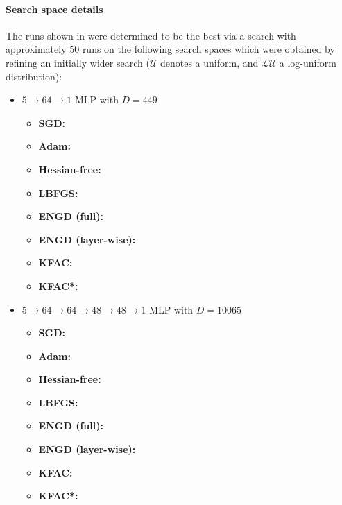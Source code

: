 \paragraph{Search space details} The runs shown in  were determined to be the best via a search with approximately 50 runs on the following search spaces which were obtained by refining an initially wider search ($\mathcal{U}$ denotes a uniform, and $\mathcal{LU}$ a log-uniform distribution):
\begin{itemize}
\item $5\to 64\to 1$ MLP with $D=449$
  \begin{itemize}
    \def\pathToRuns{kfac_pinns_exp/exp27_heat4d_small/tex}
  \item \textbf{SGD:} 
  \item \textbf{Adam:} 
  \item \textbf{Hessian-free:} 
  \item \textbf{LBFGS:} 
  \item \textbf{ENGD (full):} 
  \item \textbf{ENGD (layer-wise):} 
  \item \textbf{KFAC:} 
  \item \textbf{KFAC*:} 
  \end{itemize}

\item $5 \to 64 \to 64 \to 48 \to 48 \to 1$ MLP with $D=\num{10065}$
  \begin{itemize}
    \def\pathToRuns{kfac_pinns_exp/exp28_heat4d_medium/tex}
  \item \textbf{SGD:} 
  \item \textbf{Adam:} 
  \item \textbf{Hessian-free:} 
  \item \textbf{LBFGS:} 
  \item \textbf{ENGD (full):} 
  \item \textbf{ENGD (layer-wise):} 
  \item \textbf{KFAC:} 
  \item \textbf{KFAC*:} 
  \end{itemize}


\end{itemize}
